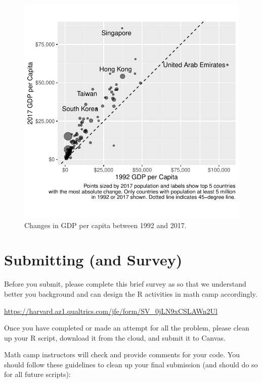 \documentclass[11pt]{article}
\begin{document}
\begin{figure}[!h]
\centering
\includegraphics[width = 0.9\linewidth]{images/gg_scatter.pdf}
\caption{Changes in GDP per capita between 1992 and 2017.}
\label{fig:hard_scatter}
\end{figure}

\newpage

\hypertarget{submitting-and-survey}{%
\section*{Submitting (and Survey)}\label{submitting-and-survey}}

Before you submit, please complete this brief survey as so that we
understand better you background and can design the R activities in math
camp accordingly.

\bigskip

\url{https://harvard.az1.qualtrics.com/jfe/form/SV_0jLN9xCSLAWn2Ul}

\bigskip

Once you have completed or made an attempt for all the problem, please
clean up your R script, download it from the cloud, and submit it to
Canvas.

Math camp instructors will check and provide comments for your code. You
should follow these guidelines to clean up your final submission (and
should do so for all future scripts):
\end{document}
